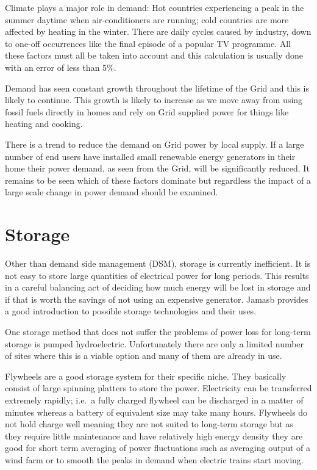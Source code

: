 \documentclass[a4paper,oneside,12pt]{report}
\begin{document}
Climate plays a major role in demand: Hot countries experiencing a peak in the summer daytime when air-conditioners are running; cold countries are more affected by heating in the winter. There are daily cycles caused by industry, down to one-off occurrences like the final episode of a popular TV programme. All these factors must all be taken into account and this calculation is usually done with an error of less than 5\%.

Demand has seen constant growth throughout the lifetime of the Grid and this is likely to continue. This growth is likely to increase as we move away from using fossil fuels directly in homes and rely on Grid supplied power for things like heating and cooking.

There is a trend to reduce the demand on Grid power by local supply. If a large number of end users have installed small renewable energy generators in their home their power demand, as seen from the Grid, will be significantly reduced. It remains to be seen which of these factors dominate but regardless the impact of a large scale change in power demand should be examined.

\section{Storage}

Other than demand side management (DSM), storage is currently inefficient. It is not easy to store large quantities of electrical power for long periods. This results in a careful balancing act of deciding how much energy will be lost in storage and if that is worth the savings of not using an expensive generator.  Jamasb \cite{Jamasb2006} provides a good introduction to possible storage technologies and their uses.

One storage method that does not suffer the problems of power loss for long-term storage is pumped hydroelectric. Unfortunately there are only a limited number of sites where this is a viable option and many of them are already in use.

Flywheels are a good storage system for their specific niche. They basically consist of large spinning platters to store the power. Electricity can be transferred extremely rapidly; i.e.\ a fully charged flywheel can be discharged in a matter of minutes whereas a battery of equivalent size may take many hours. Flywheels do not hold charge well meaning they are not suited to long-term storage but as they require little maintenance and have relatively high energy density they are good for short term averaging of power fluctuations such as averaging output of a wind farm or to smooth the peaks in demand when electric trains start moving.
\end{document}
